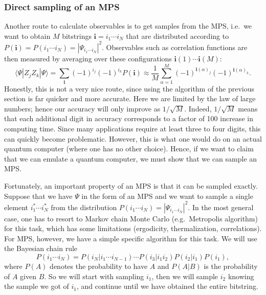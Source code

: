\documentclass{SciPost}
\newcommand{\ket}[1]{|#1\rangle}
\newcommand{\bra}[1]{\langle #1|}
\begin{document}
\subsubsection{Direct sampling of an MPS}
Another route to calculate observables is to get samples from the MPS, i.e.\ we want to obtain $M$
bitstrings $\mathbf{i} =i_1\cdots{}i_N$ that are distributed according to $P(\mathbf{i})=P(i_1\cdots{}i_N)=|\Psi_{i_1\cdots{}i_N}|^2$. Observables such as correlation functions are then measured
by averaging over these configurations $\mathbf{i}(1)\cdots{}\mathbf{i}(M)$:
\begin{equation}
\bra{\Psi} Z_j Z_k \ket{\Psi} = \sum_\mathbf{i} (-1)^{i_j}(-1)^{i_k} P(\mathbf{i})
\approx \frac{1}{M}\sum_{\alpha=1}^M  (-1)^{\mathbf{i}(\alpha)_j}(-1)^{\mathbf{i}(\alpha)_k}.
\end{equation}
Honestly, this is not a very nice route, since using the algorithm of the previous section is far quicker and more accurate. Here we are limited by the law of large numbers; hence our accuracy will only improve as $1/\sqrt{M}$. Indeed, $1/\sqrt{M}$ means that each additional digit in accuracy corresponds to a factor of 100 increase in computing time. Since many applications require at least three to four digits, this can quickly become problematic. However, this is what one would do on an actual quantum computer (where one has no other choice). Hence, if we want to claim that we can emulate a quantum computer, we must show that we can sample an MPS.

Fortunately, an important property of an MPS is that it can be sampled exactly. Suppose that we have $\Psi$ in the form of an MPS and we want to sample a single element $i_1^*\cdots{}i_N^*$ from the distribution $P(i_1\cdots{}i_N)=|\Psi_{i_1\cdots{}i_N}|^2$. In the most general case, one has to resort to Markov chain Monte Carlo (e.g.\ Metropolis algorithm) for this task, which has some limitations (ergodicity, thermalization, correlations). For MPS, however, we have a simple specific algorithm for this task. We will use the Bayesian chain rule
\begin{equation}
P(i_1\cdots{}i_N)=  P(i_N|i_1\cdots{}i_{N-1})\cdots{}P(i_3|i_1i_2)P(i_2|i_1)P(i_1),
\end{equation}
where $P(A)$ denotes the probability to have $A$ and $P(A|B)$ is the probability of $A$ given $B$. So we will start with sampling $i_1$, then we will sample $i_2$ knowing the sample we got of $i_1$, and continue until we have obtained the entire bitstring.
\end{document}
